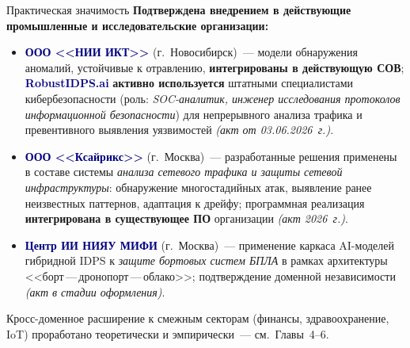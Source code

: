 \documentclass[10pt,aspectratio=169]{beamer}
\newcommand{\hl}[1]{\textcolor{accent}{\textbf{#1}}}
\newcommand{\bn}[1]{\textcolor{navy}{\textbf{#1}}}
\begin{document}
\begin{frame}{Практическая значимость}
\footnotesize
\textbf{Подтверждена внедрением в действующие промышленные и
исследовательские организации:}
\smallskip
\begin{itemize}\setlength\itemsep{3pt}
\item \bn{ООО <<НИИ ИКТ>>} (г.~Новосибирск)~--- модели
обнаружения аномалий, устойчивые к отравлению,
\hl{интегрированы в действующую СОВ}; \bn{RobustIDPS.ai}
\hl{активно используется} штатными специалистами
кибербезопасности (роль: \emph{SOC-аналитик, инженер
исследования протоколов информационной безопасности}) для
непрерывного анализа трафика и превентивного выявления
уязвимостей \emph{(акт от 03.06.2026~г.)}.

\item \bn{ООО <<Ксайрикс>>} (г.~Москва)~--- разработанные
решения применены в составе системы \emph{анализа сетевого
трафика и защиты сетевой инфраструктуры}: обнаружение
многостадийных атак, выявление ранее неизвестных паттернов,
адаптация к дрейфу; программная реализация
\hl{интегрирована в существующее ПО} организации
\emph{(акт 2026~г.)}.

\item \bn{Центр ИИ НИЯУ МИФИ} (г.~Москва)~--- применение
каркаса AI-моделей гибридной IDPS к \emph{защите бортовых
систем БПЛА} в рамках архитектуры
<<борт\,---\,дронопорт\,---\,облако>>; подтверждение
доменной независимости \emph{(акт в стадии оформления)}.
\end{itemize}
\smallskip
\begin{block}{}
\scriptsize Кросс-доменное расширение к смежным секторам
(финансы, здравоохранение, IoT) проработано теоретически
и эмпирически~--- см.\ Главы~4--6.
\end{block}
\end{frame}
\end{document}

